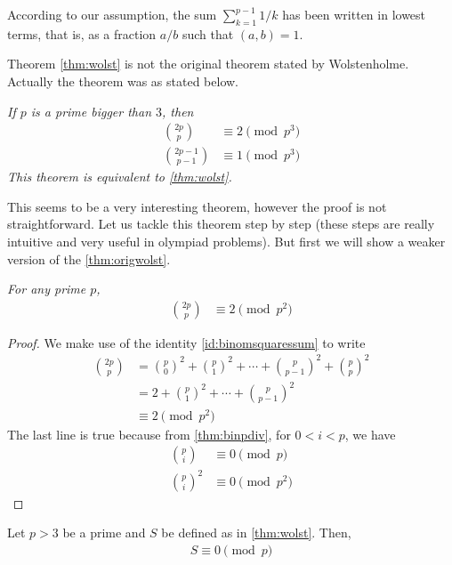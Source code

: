 \documentclass[12pt]{subfile}
\begin{document}
		\begin{note}
			According to our assumption, the sum $ \sum_{k=1}^{p-1} 1/k$ has been written in lowest terms, that is, as a fraction $a/b$ such that $(a,b)=1$.
		\end{note}

		\begin{remark}
			Theorem \eqref{thm:wolst} is not the original theorem stated by Wolstenholme. Actually the theorem was as stated below.
		\end{remark}

		\begin{theorem}\slshape\label{thm:origwolst}
			If $p$ is a prime bigger than $3$, then
			\begin{align*}
				\binom{2p}{p} & \equiv2\pmod{p^3}\\
				\binom{2p-1}{p-1} & \equiv 1 \pmod{p^3}
			\end{align*}
			This theorem is equivalent to \autoref{thm:wolst}.
		\end{theorem}
	This seems to be a very interesting theorem, however the proof is not straightforward. Let us tackle this theorem step by step (these steps are really intuitive and very useful in olympiad problems). But first we will show a weaker version of the \autoref{thm:origwolst}.
		\begin{theorem}\slshape
			For any prime $p$,
				\begin{align*}
					\binom{2p}{p} & \equiv2\pmod{p^2}
				\end{align*}
		\end{theorem}

		\begin{proof}
			We make use of the identity \eqref{id:binomsquaressum} to write
				\begin{align*}
					\binom{2p}p & = \binom{p}0^2+\binom{p}{1}^2+\cdots+\binom{p}{p-1}^2+\binom{p}{p}^2\\
								& = 2+\binom{p}{1}^2+\cdots+\binom{p}{p-1}^2\\
								& \equiv2\pmod{p^2}
				\end{align*}
			The last line is true because from \autoref{thm:binpdiv}, for $0<i<p$, we have
				\begin{align*}
					\binom{p}{i}
						& \equiv 0\pmod p\\
					\binom{p}{i}^2
						& \equiv 0\pmod{p^2}
				\end{align*}
		\end{proof}

		\begin{lemma}\label{lem:wolstproof1}
			Let $p>3$ be a prime and $S$ be defined as in \autoref{thm:wolst}. Then,
				\begin{align*}
					S \equiv 0 \pmod p
				\end{align*}
		\end{lemma}
\end{document}
